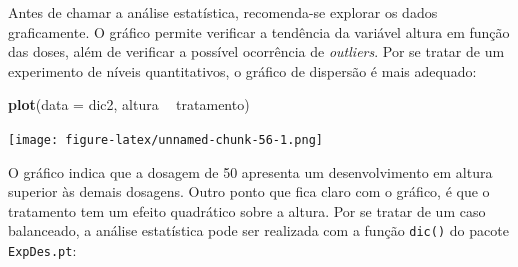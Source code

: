 \documentclass[
]{article}
\newenvironment{Shaded}{\begin{snugshade}}{\end{snugshade}}
\newcommand{\DataTypeTok}[1]{\textcolor[rgb]{0.13,0.29,0.53}{#1}}
\newcommand{\KeywordTok}[1]{\textcolor[rgb]{0.13,0.29,0.53}{\textbf{#1}}}
\newcommand{\NormalTok}[1]{#1}
\newcommand{\OperatorTok}[1]{\textcolor[rgb]{0.81,0.36,0.00}{\textbf{#1}}}
\newcommand{\OtherTok}[1]{\textcolor[rgb]{0.56,0.35,0.01}{#1}}
\newcommand{\StringTok}[1]{\textcolor[rgb]{0.31,0.60,0.02}{#1}}
\begin{document}
Antes de chamar a análise estatística, recomenda-se explorar os dados graficamente. O gráfico permite verificar a tendência da variável altura em função das doses, além de verificar a possível ocorrência de \emph{outliers}. Por se tratar de um experimento de níveis quantitativos, o gráfico de dispersão é mais adequado:

\begin{Shaded}
\begin{Highlighting}[]
\KeywordTok{plot}\NormalTok{(}\DataTypeTok{data =}\NormalTok{ dic2, altura }\OperatorTok{~}\StringTok{ }\NormalTok{tratamento)}
\end{Highlighting}
\end{Shaded}

\texttt{[image: figure-latex/unnamed-chunk-56-1.png]}

O gráfico indica que a dosagem de 50 apresenta um desenvolvimento em altura superior às demais dosagens. Outro ponto que fica claro com o gráfico, é que o tratamento tem um efeito quadrático sobre a altura. Por se tratar de um caso balanceado, a análise estatística pode ser realizada com a função \texttt{dic()} do pacote \texttt{ExpDes.pt}:

\begin{Shaded}
\end{Shaded}
\end{document}
